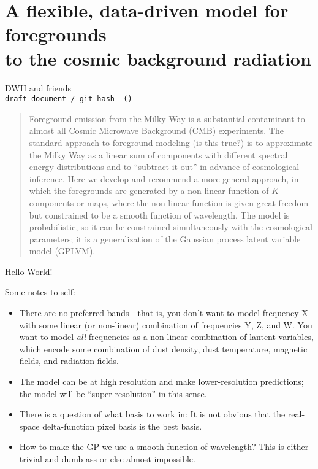 \documentclass[12pt]{article}
\begin{document}
\section*{A flexible, data-driven model for foregrounds \\ to the cosmic background radiation}
\noindent
DWH and friends\\
{\footnotesize
\texttt{draft document / git hash \githash\ (\gitdate)}}

\begin{abstract}
Foreground emission from the Milky Way is a substantial contaminant to
almost all Cosmic Microwave Background (CMB) experiments.
The standard approach to foreground modeling (is this true?) is to
approximate the Milky Way as a linear sum of components with different
spectral energy distributions and to ``subtract it out'' in advance of
cosmological inference.
Here we develop and recommend a more general approach, in which the
foregrounds are generated by a non-linear function of $K$ components
or maps, where the non-linear function is given great freedom but
constrained to be a smooth function of wavelength.
The model is probabilistic, so it can be constrained simultaneously
with the cosmological parameters; it is a generalization of the
Gaussian process latent variable model (GPLVM).
\end{abstract}

Hello World!

\clearpage

Some notes to self:
\begin{itemize}
\item There are no preferred bands---that is, you don't want to model
  frequency X with some linear (or non-linear) combination of
  frequencies Y, Z, and W.  You want to model \emph{all} frequencies
  as a non-linear combination of lantent variables, which encode some
  combination of dust density, dust temperature, magnetic fields, and
  radiation fields.
\item The model can be at high resolution and make lower-resolution
  predictions; the model will be ``super-resolution'' in this sense.
\item There is a question of what basis to work in: It is not obvious
  that the real-space delta-function pixel basis is the best basis.
\item How to make the GP we use a smooth function of wavelength?  This
  is either trivial and dumb-ass or else almost impossible.
\end{itemize}
\end{document}

